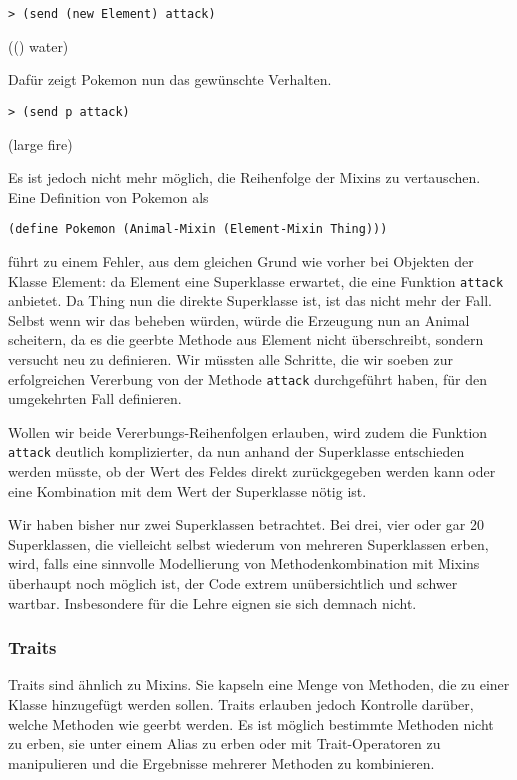 \begin{lstlisting}
> (send (new Element) attack)
\end{lstlisting}
{\rsymbol (() water)}

Dafür zeigt Pokemon nun das gewünschte Verhalten.
\begin{lstlisting}
> (send p attack)
\end{lstlisting}
{\rsymbol (large fire)}

Es ist jedoch nicht mehr möglich, die Reihenfolge der Mixins zu vertauschen. Eine Definition von Pokemon als

\begin{lstlisting}
(define Pokemon (Animal-Mixin (Element-Mixin Thing)))
\end{lstlisting}

führt zu einem Fehler, aus dem gleichen Grund wie vorher bei Objekten der Klasse Element: da Element eine Superklasse erwartet, die eine Funktion \texttt{attack} anbietet. Da Thing nun die direkte Superklasse ist, ist das nicht mehr der Fall. Selbst wenn wir das beheben würden, würde die Erzeugung nun an Animal scheitern, da es die geerbte Methode aus Element nicht überschreibt, sondern versucht neu zu definieren. Wir müssten alle Schritte, die wir soeben zur erfolgreichen Vererbung von der Methode \texttt{attack} durchgeführt haben, für den umgekehrten Fall definieren. 

Wollen wir beide Vererbungs-Reihenfolgen erlauben, wird zudem die Funktion \texttt{attack} deutlich komplizierter, da nun anhand der Superklasse entschieden werden müsste, ob der Wert des Feldes direkt zurückgegeben werden kann oder eine Kombination mit dem Wert der Superklasse nötig ist.

Wir haben bisher nur zwei Superklassen betrachtet. Bei drei, vier oder gar 20 Superklassen, die vielleicht selbst wiederum von mehreren Superklassen erben, wird, falls eine sinnvolle Modellierung von Methodenkombination mit Mixins überhaupt noch möglich ist, der Code extrem unübersichtlich und schwer wartbar. Insbesondere für die Lehre eignen sie sich demnach nicht.

\subsubsection{Traits}
Traits sind ähnlich zu Mixins. Sie kapseln eine Menge von Methoden, die zu einer Klasse hinzugefügt werden sollen. Traits erlauben jedoch Kontrolle darüber, welche Methoden wie geerbt werden. Es ist möglich bestimmte Methoden nicht zu erben, sie unter einem Alias zu erben oder mit Trait-Operatoren zu manipulieren und die Ergebnisse mehrerer Methoden zu kombinieren.


